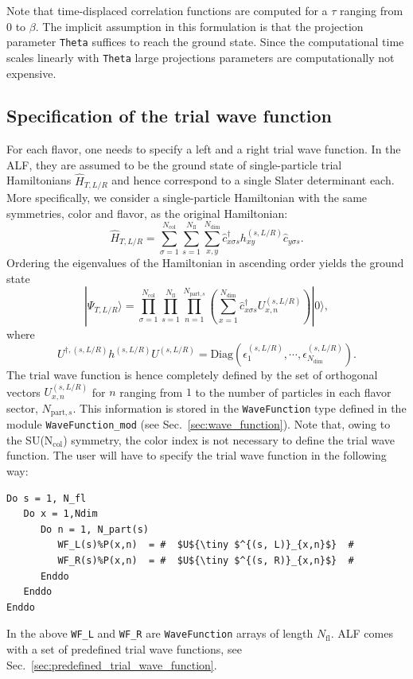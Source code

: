 Note that time-displaced correlation functions  are computed for a $\tau$ ranging from $0$ to $\beta$.  The implicit assumption  in this formulation is that  the projection  parameter  \texttt{Theta}  suffices to reach the ground state.    Since the  computational time scales linearly with  \texttt{Theta}   large projections parameters are computationally not expensive. 


\subsection{Specification of the trial wave function} \label{sec:trial_wave_function}

For each flavor, one needs to specify a left and a right trial wave function. In the ALF, they are assumed to be the ground state of single-particle trial Hamiltonians $\hat{H}_{T, L/R}$ and hence correspond to a single Slater determinant each. More specifically, we consider a single-particle Hamiltonian with the same symmetries, color and flavor,  as the original Hamiltonian:
\begin{equation} \label{eq:trial_wave_function}
\hat{H}_{T,L/R} = 
\sum\limits_{\sigma=1}^{N_{\mathrm{col}}}
\sum\limits_{s=1}^{N_{\mathrm{fl}}}
\sum\limits_{x,y}^{N_{\mathrm{dim}}}
\hat{c}^{\dagger}_{x \sigma   s} h_{xy}^{(s, L/R)} \hat{c}^{\phantom\dagger}_{y \sigma s}.
\end{equation}
Ordering the eigenvalues  of the Hamiltonian in ascending order yields the ground state
\begin{equation}
	 | \Psi_{T,L/R} \rangle    =     \prod_{\sigma=1}^{N_{\mathrm{col}}}  \prod_{s=1}^{N_{\mathrm{fl}}}      \prod_{n=1}^{N_{\mathrm{part},s}} 
	 \left( \sum_{x=1}^{N_{\mathrm{dim}}}    \hat{c}^{\dagger}_{x \sigma   s} U^{(s, L/R)}_{x,n} \right) 
	  | 0 \rangle ,
\end{equation} 
where 
\begin{equation}
	U^{\dagger,(s, L/R)}h^{(s, L/R)}  U^{(s, L/R)}   = \mathrm{Diag} \left(   \epsilon_1^{(s, L/R)}, \cdots, \epsilon_{N_{\mathrm{dim}}}^{(s, L/R)} \right).
\end{equation}
The trial wave function is hence  completely defined by the set of orthogonal vectors  $ U^{(s, L/R)}_{x,n} $  for  $ n $ ranging from  $ 1 $ to  the number of particles   in each flavor sector, $N_{\mathrm{part},s}$.  This information  is stored in the \texttt{WaveFunction}  type defined in the module \texttt{WaveFunction\_mod} (see Sec.~\ref{sec:wave_function}).  Note that, owing to the SU(N$_{\mathrm{col}}$) symmetry, the color index is not necessary to define  the trial wave function.  The user will have to specify the trial wave function in the following way:
\begin{lstlisting}[style=fortran,escapechar=\#]
Do s = 1, N_fl
   Do x = 1,Ndim
      Do n = 1, N_part(s)
         WF_L(s)%P(x,n)  = #  $U${\tiny $^{(s, L)}_{x,n}$}  #
         WF_R(s)%P(x,n)  = #  $U${\tiny $^{(s, R)}_{x,n}$}  #
      Enddo
   Enddo
Enddo
\end{lstlisting}
In the above \texttt{WF\_L} and \texttt{WF\_R} are \texttt{WaveFunction} arrays of length $N_{\mathrm{fl}}$. ALF comes with a set of predefined trial wave functions, see Sec.~\ref{sec:predefined_trial_wave_function}.

